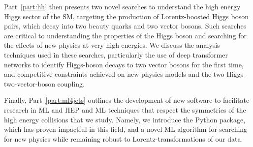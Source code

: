 Part~\ref{part:hh} then presents two novel searches to understand the high energy Higgs sector of the SM, targeting the production of Lorentz-boosted Higgs boson pairs, which decay into two beauty quarks and two vector bosons.
Such searches are critical to understanding the properties of the Higgs boson and searching for the effects of new physics at very high energies.
We discuss the analysis techniques used in these searches, particularly the use of deep transformer networks to identify Higgs-boson decays to two vector bosons for the first time, and competitive constraints achieved on new physics models and the two-Higgs-two-vector-boson coupling.

Finally, Part~\ref{part:ml4jets} outlines the development of new software to facilitate research in ML and HEP and ML techniques that respect the symmetries of the high energy collisions that we study.
Namely, we introduce the \jetnet Python package, which has proven impactful in this field, and a novel ML algorithm for searching for new physics while remaining robust to Lorentz-transformations of our data.
